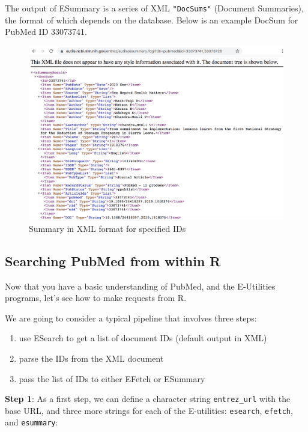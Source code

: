 \documentclass[
]{book}
\begin{document}
The output of ESummary is a series of XML \texttt{"DocSums"} (Document Summaries), the
format of which depends on the database. Below is an example DocSum for PubMed
ID 33073741.

\begin{figure}

{\centering \includegraphics[width=0.8\linewidth]{images/api/pubmed-esummary} 

}

\caption{Summary in XML format for specified IDs}\label{fig:unnamed-chunk-149}
\end{figure}

\hypertarget{searching-pubmed-from-within-r}{%
\subsection{Searching PubMed from within R}\label{searching-pubmed-from-within-r}}

Now that you have a basic understanding of PubMed, and the E-Utilities
programs, let's see how to make requests from R.

We are going to consider a typical pipeline that involves three steps:

\begin{enumerate}
\def\labelenumi{\arabic{enumi})}
\item
  use ESearch to get a list of document IDs (default output in XML)
\item
  parse the IDs from the XML document
\item
  pass the list of IDs to either EFetch or ESummary
\end{enumerate}

\textbf{Step 1}: As a first step, we can define a character string \texttt{entrez\_url} with
the base URL, and three more strings for each of the E-utilities: \texttt{esearch},
\texttt{efetch}, and \texttt{esummary}:
\end{document}
